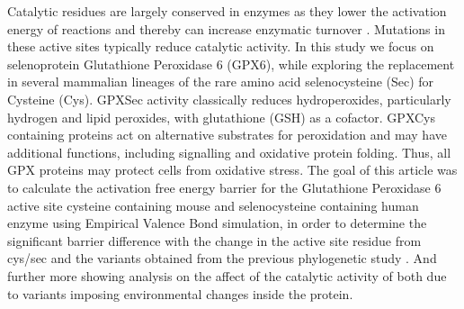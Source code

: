 Catalytic residues are largely conserved in enzymes as they lower the activation energy of reactions and thereby can increase enzymatic turnover \cite{rees_ancient_2024}. Mutations in these active sites typically reduce catalytic activity. In this study we focus on selenoprotein Glutathione Peroxidase 6 (GPX6), while exploring the replacement in several mammalian lineages of the rare amino acid selenocysteine (Sec) for Cysteine (Cys). GPXSec activity classically reduces hydroperoxides, particularly hydrogen and lipid peroxides, with glutathione (GSH) as a cofactor. GPXCys  containing proteins act on alternative substrates for peroxidation and may have additional functions, including signalling and oxidative protein folding. Thus,  all GPX proteins may protect cells from oxidative stress. The goal of this article was  to calculate the activation free energy barrier for the Glutathione Peroxidase 6 active site cysteine containing mouse and selenocysteine containing human enzyme using Empirical Valence Bond simulation, in order to determine the significant barrier difference with the change in the active site residue from cys/sec and the variants obtained from the previous phylogenetic study \cite{rees_ancient_2024}. And further more showing analysis on the affect of the catalytic activity of both due to variants imposing environmental changes inside the protein.  


